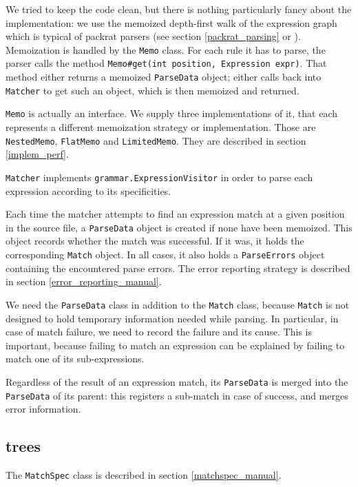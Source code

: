 We tried to keep the code clean, but there is nothing particularly fancy about
the implementation: we use the memoized depth-first walk of the expression graph
which is typical of packrat parsers (see section \ref{packrat_parsing} or
\cite{ford2002}). Memoization is handled by the \texttt{Memo} class. For each
rule it has to parse, the parser calls the method \texttt{Memo\#get(int position,
  Expression expr)}. That method either returns a memoized \texttt{ParseData}
object; either calls back into \texttt{Matcher} to get such an object, which is
then memoized and returned.

\texttt{Memo} is actually an interface. We supply three implementations of it,
that each represents a different memoization strategy or implementation. Those
are \texttt{NestedMemo}, \texttt{FlatMemo} and \texttt{LimitedMemo}. They are
described in section \ref{implem_perf}.

\texttt{Matcher} implements \texttt{grammar.ExpressionVisitor} in order to parse
each expression according to its specificities.

Each time the matcher attempts to find an expression match at a given position
in the source file, a \texttt{ParseData} object is created if none have been
memoized. This object records whether the match was successful. If it was, it
holds the corresponding \texttt{Match} object. In all cases, it also holds a
\texttt{ParseErrors} object containing the encountered parse errors. The error
reporting strategy is described in section \ref{error_reporting_manual}.

We need the \texttt{ParseData} class in addition to the \texttt{Match} class,
because \texttt{Match} is not designed to hold temporary information needed
while parsing. In particular, in case of match failure, we need to record the
failure and its cause. This is important, because failing to match an expression
can be explained by failing to match one of its sub-expressions.

Regardless of the result of an expression match, its \texttt{ParseData} is
merged into the \texttt{ParseData} of its parent: this registers a sub-match in
case of success, and merges error information.

\subsection{trees}

The \texttt{MatchSpec} class is described in section \ref{matchspec_manual}.

